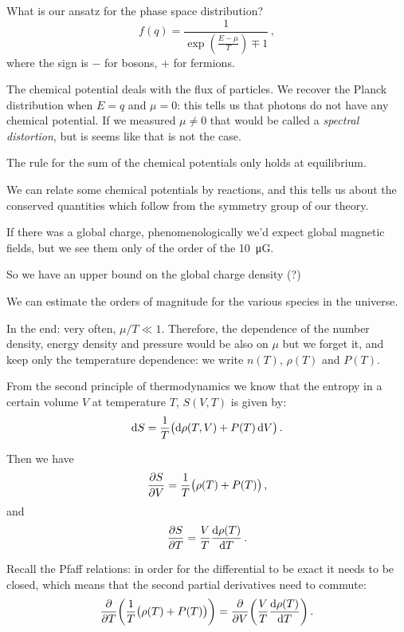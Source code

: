 \documentclass[main.tex]{subfiles}
\begin{document}
What is our ansatz for the phase space distribution?  
%
\begin{equation}
  f(q) = \frac{1}{\exp(\frac{E-\mu }{T}) \mp 1 }
\,,
\end{equation}
%
where the sign is \(-\) for bosons, \(+\) for fermions.

The chemical potential deals with the flux of particles.
We recover the Planck distribution when \(E = q\) and \(\mu = 0\): this tells us that photons do not have any chemical potential.
If we measured \(\mu \neq 0 \) that would be called a \emph{spectral distortion}, but is seems like that is not the case.

The rule for the sum of the chemical potentials only holds at equilibrium.

We can relate some chemical potentials by reactions, and this tells us about the conserved quantities which follow from the symmetry group of our theory.

If there was a global charge, phenomenologically we'd expect global magnetic fields, but we see them only of the order of the \SI{10}{\micro G}.

So we have an upper bound on the global charge density (?)

We can estimate the orders of magnitude for the various species in the universe.

In the end: very often, \(\mu / T \ll 1\).
Therefore, the dependence of the number density, energy density and pressure would be also on \(\mu \) but we forget it, and keep only the temperature dependence: we write \(n(T)\), \(\rho (T)\) and \(P(T)\).

From the second principle of thermodynamics we know that the entropy in a certain volume \(V\) at temperature \(T\), \(S(V, T)\) is given by: 
%
\begin{equation}
  \dd{S}  = \frac{1}{T} \qty(\dd{\rho (T, V)}  + P(T) \dd{V} )
\,.
\end{equation}
%
 
Then we have 
%
\begin{equation}
  \pdv{S}{V} = \frac{1}{T} \qty(\rho (T) + P(T))
\,,
\end{equation}
%
and 
%
\begin{equation}
  \pdv{S}{T} = \frac{V}{T} \dv{\rho (T)}{T} 
\,.
\end{equation}
%

Recall the Pfaff relations: in order for the differential to be exact it needs to be closed, which means that the second partial derivatives need to commute: 
%
\begin{equation}
  \pdv{}{T}  \qty(\frac{1}{T}\qty(\rho (T) + P(T))) 
  = \pdv{}{V} \qty(\frac{V}{T} \dv{\rho (T)}{T} ) 
\,.
\end{equation}
\end{document}
